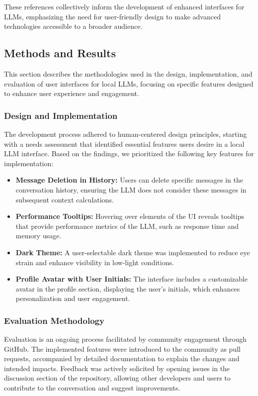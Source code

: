 \documentclass[sigconf, nonacm]{acmart}
\begin{document}
These references collectively inform the development of enhanced interfaces for LLMs, emphasizing the need for user-friendly design to make advanced technologies accessible to a broader audience.

\subsection{Methods and Results}
This section describes the methodologies used in the design, implementation, and evaluation of user interfaces for local LLMs, focusing on specific features designed to enhance user experience and engagement.

\subsubsection{Design and Implementation}
The development process adhered to human-centered design principles, starting with a needs assessment that identified essential features users desire in a local LLM interface. Based on the findings, we prioritized the following key features for implementation:

\begin{itemize}
    \item \textbf{Message Deletion in History:} Users can delete specific messages in the conversation history, ensuring the LLM does not consider these messages in subsequent context calculations.
    \item \textbf{Performance Tooltips:} Hovering over elements of the UI reveals tooltips that provide performance metrics of the LLM, such as response time and memory usage.
    \item \textbf{Dark Theme:} A user-selectable dark theme was implemented to reduce eye strain and enhance visibility in low-light conditions.
    \item \textbf{Profile Avatar with User Initials:} The interface includes a customizable avatar in the profile section, displaying the user's initials, which enhances personalization and user engagement.
\end{itemize}

\subsubsection{Evaluation Methodology}
Evaluation is an ongoing process facilitated by community engagement through GitHub. The implemented features were introduced to the community as pull requests, accompanied by detailed documentation to explain the changes and intended impacts. Feedback was actively solicited by opening issues in the discussion section of the repository, allowing other developers and users to contribute to the conversation and suggest improvements.
\end{document}
